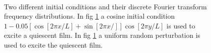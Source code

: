 \documentclass[a4paper,12pt]{article}
\begin{document}
  \begin{figure} 
   \centering
     \\
   \caption{Two different initial conditions and their discrete Fourier transform frequency distributions. In fig \ref{fig_ic} a cosine initial condition $1 - 0.05 \left[ \cos [2 \pi x/L] + \sin [2 \pi x/]\right] \cos[2 \pi y/L]$ is used to excite a quiescent film. In fig \ref{fig_ic}  a uniform random perturbation is used to excite the quiescent film.}
   \label{fig_ic}
  \end{figure}
\end{document}
